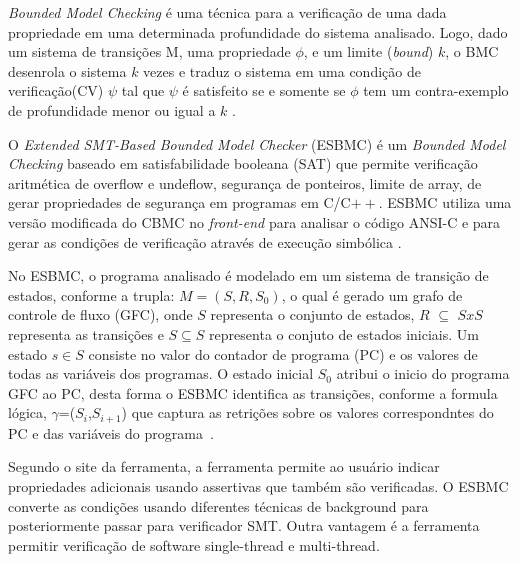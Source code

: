 \par
\textit{Bounded Model Checking} é uma técnica para a verificação de uma dada propriedade em uma determinada profundidade do sistema analisado. Logo, dado um sistema de transições M, uma propriedade $\phi$, e um limite (\textit{bound}) $k$, o BMC desenrola o sistema $k$ vezes e traduz o sistema em uma condição de verificação(CV) $\psi$ tal que $\psi$ é satisfeito se e somente se $\phi$ tem um contra-exemplo de profundidade menor ou igual a $k$ \cite{rocha2015verificaccao}.

\par
O \textit{Extended SMT-Based Bounded Model Checker} (ESBMC) é um \textit{Bounded Model Checking} baseado em satisfabilidade booleana (SAT) que permite verificação aritmética de overflow e undeflow, segurança de ponteiros, limite de array, de gerar propriedades de segurança em programas em C/C$++$. ESBMC utiliza uma versão modificada do CBMC no \textit{front-end} para analisar o código ANSI-C e para gerar as condições de verificação através de execução simbólica \cite{cordeiro2012smt,rocha2015verificaccao}.

\par
No ESBMC, o programa analisado é modelado em um sistema de transição de estados, conforme a trupla: $M=(S,R,S_{0})$, o qual é gerado um grafo de controle de fluxo (GFC), onde $S$ representa o conjunto de estados, $R$ $\subseteq$ $SxS$ representa as transições e $S \subseteq S$ representa o conjuto de estados iniciais. Um estado $s \in S$ consiste no valor do contador de programa (PC) e os valores de todas as variáveis dos programas. O estado inicial $S_{0}$ atribui o inicio do programa GFC ao PC, desta forma o ESBMC identifica as transições, conforme a formula lógica, $\gamma$=($S_{i}$,$S_{i+1}$) que captura as retrições sobre os valores correspondntes do PC e das variáveis do programa~\cite{cordeiro2012smt}.

\par
Segundo o site da ferramenta, a ferramenta permite ao usuário indicar propriedades adicionais usando assertivas que também são verificadas. O ESBMC converte as condições usando diferentes técnicas de background para posteriormente passar para verificador SMT. Outra vantagem é a ferramenta permitir verificação de software single-thread e multi-thread.


